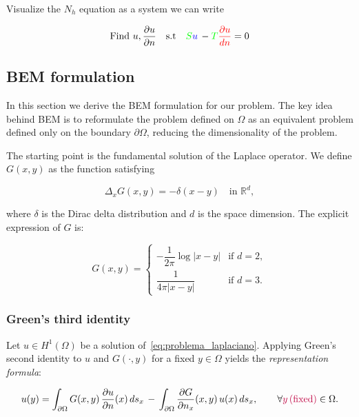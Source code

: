 \documentclass[11pt,onecolumn]{article}
\begin{document}
Visualize the $N_h$ equation as a system we can write

\begin{equation}
\begin{aligned}
&\text{Find } u,\frac{\partial u}{\partial n} \quad \text{s.t}
&{\color{green}S}{\color{blue}u}  \, - {\color{green}T}{\color{red}\frac{\partial u}{dn}} = 0
\end{aligned}
\label{eq:discrete_formulation_5}
\end{equation}

\subsection{BEM formulation}
In this section we derive the BEM formulation for our problem. The key idea behind BEM is to reformulate the problem defined on $\Omega$ as an equivalent problem defined only on the boundary $\partial\Omega$, reducing the dimensionality of the problem.

The starting point is the fundamental solution of the Laplace operator. We define $G(x,y)$ as the function satisfying

\begin{equation}
    \Delta_x G(x,y) = -\delta(x-y) \quad \text{in } \mathbb{R}^d,
\label{eq:fundamental_solution}
\end{equation}

where $\delta$ is the Dirac delta distribution and $d$ is the space dimension. The explicit expression of $G$ is:

\begin{equation}
G(x,y) = 
\begin{cases}
-\dfrac{1}{2\pi} \log |x - y| & \text{if } d = 2, \\[6pt]
\dfrac{1}{4\pi |x - y|} & \text{if } d = 3.
\end{cases}
\label{eq:green_function}
\end{equation}

\subsubsection{Green's third identity}
Let $u \in H^1(\Omega)$ be a solution of~\eqref{eq:problema_laplaciano}. Applying Green's second identity to $u$ and $G(\cdot, y)$ for a {\color{purple}fixed $y \in \Omega$ } yields the \textit{representation formula}:

\begin{equation}
u(y) = \int_{\partial\Omega} G(x,y)\, \frac{\partial u}{\partial n}(x)\, ds_x 
\,-\, \int_{\partial\Omega} \frac{\partial G}{\partial n_x}(x,y)\, u(x)\, ds_x, 
\qquad \forall {\color{purple} y \, \text{(fixed)}} \in \Omega.
\label{eq:representation_formula}
\end{equation}
\end{document}
